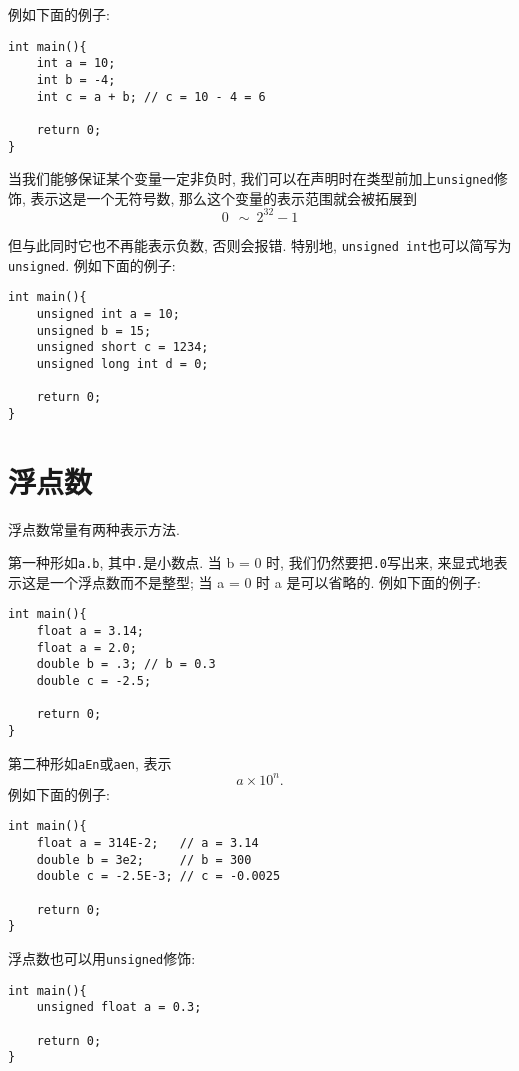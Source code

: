         例如下面的例子:
\begin{lstlisting}
int main(){
    int a = 10;
    int b = -4;
    int c = a + b; // c = 10 - 4 = 6

    return 0;
}
\end{lstlisting}

        \begin{sloppypar}
        当我们能够保证某个变量一定非负时, 我们可以在声明时在类型前加上\texttt{unsigned}修饰, 表示这是一个无符号数, 那么这个变量的表示范围就会被拓展到
            \[ 0 \ \ \sim \ 2 ^ {32} - 1 \]
        \end{sloppypar}

        \begin{sloppypar}
        但与此同时它也不再能表示负数, 否则会报错. 特别地, \texttt{unsigned int}也可以简写为\texttt{unsigned}. 例如下面的例子:
        \end{sloppypar}

\begin{lstlisting}
int main(){
    unsigned int a = 10;
    unsigned b = 15;
    unsigned short c = 1234;
    unsigned long int d = 0;

    return 0;
}
\end{lstlisting}

    \section{浮点数}
        浮点数常量有两种表示方法. 
        
        第一种形如\texttt{a.b}, 其中\texttt{.}是小数点. 当 b = 0 时, 我们仍然要把\texttt{.0}写出来, 来显式地表示这是一个浮点数而不是整型; 当 a = 0 时 a 是可以省略的. 例如下面的例子:
\begin{lstlisting}
int main(){
    float a = 3.14;
    float a = 2.0;
    double b = .3; // b = 0.3
    double c = -2.5;

    return 0;
}
\end{lstlisting}

        第二种形如\texttt{aEn}或\texttt{aen}, 表示
            \[ a \times 10 ^ n. \]
        例如下面的例子:
\begin{lstlisting}
int main(){
    float a = 314E-2;   // a = 3.14
    double b = 3e2;     // b = 300
    double c = -2.5E-3; // c = -0.0025

    return 0;
}
\end{lstlisting}

        浮点数也可以用\texttt{unsigned}修饰:
\begin{lstlisting}
int main(){
    unsigned float a = 0.3;

    return 0;
}
\end{lstlisting}

